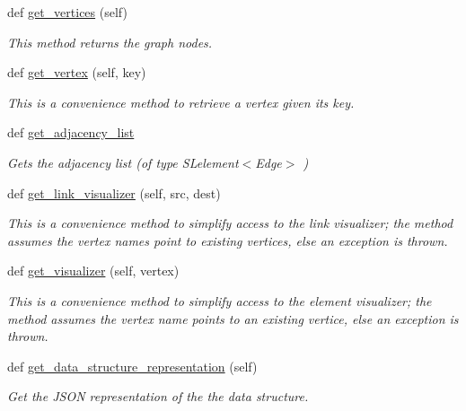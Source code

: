 \begin{DoxyCompactItemize}
def \hyperlink{class_graph_adj_list_1_1_graph_adj_list_af137af52d0654e91b94d1c220c1efd58}{get\+\_\+vertices} (self)
\begin{DoxyCompactList}\small\item\em This method returns the graph nodes. \end{DoxyCompactList}\item 
def \hyperlink{class_graph_adj_list_1_1_graph_adj_list_a1d3a3f647ed56279f150677929c54b8d}{get\+\_\+vertex} (self, key)
\begin{DoxyCompactList}\small\item\em This is a convenience method to retrieve a vertex given its key. \end{DoxyCompactList}\item 
def \hyperlink{class_graph_adj_list_1_1_graph_adj_list_a755bfecc6b07c3b1b626053686468472}{get\+\_\+adjacency\+\_\+list}
\begin{DoxyCompactList}\small\item\em Gets the adjacency list (of type S\+Lelement$<$\+Edge$>$ ) \end{DoxyCompactList}\item 
def \hyperlink{class_graph_adj_list_1_1_graph_adj_list_ac1be5a9c6eb1150778f808b13dd7bf16}{get\+\_\+link\+\_\+visualizer} (self, src, dest)
\begin{DoxyCompactList}\small\item\em This is a convenience method to simplify access to the link visualizer; the method assumes the vertex names point to existing vertices, else an exception is thrown. \end{DoxyCompactList}\item 
def \hyperlink{class_graph_adj_list_1_1_graph_adj_list_ab9d8c6bcf744f224ff04a727f732a143}{get\+\_\+visualizer} (self, vertex)
\begin{DoxyCompactList}\small\item\em This is a convenience method to simplify access to the element visualizer; the method assumes the vertex name points to an existing vertice, else an exception is thrown. \end{DoxyCompactList}\item 
def \hyperlink{class_graph_adj_list_1_1_graph_adj_list_a7ed797dee8179f0a7a97d599c3e51b9b}{get\+\_\+data\+\_\+structure\+\_\+representation} (self)
\begin{DoxyCompactList}\small\item\em Get the J\+S\+O\+N representation of the the data structure. \end{DoxyCompactList}\end{DoxyCompactItemize}
